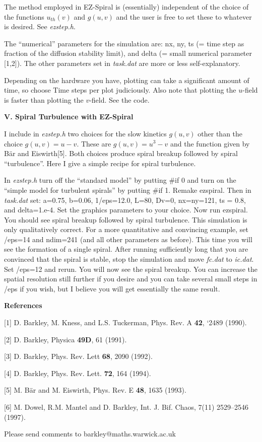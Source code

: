 \documentclass[12pt]{article}
\begin{document}
The method employed in EZ-Spiral is (essentially) independent of the
choice of the functions $u_{th}(v)$ and $g(u,v)$ and the user is free
to set these to whatever is desired.  See {\em ezstep.h}.

The ``numerical'' parameters for the simulation are: {\sf nx}, {\sf ny}, {\sf
ts} (= time step as fraction of the diffusion stability limit), and {\sf
delta} (= small numerical parameter [1,2]).  The other parameters set in {\em
task.dat} are more or less self-explanatory.

Depending on the hardware you have, plotting can take a significant amount of
time, so choose {\sf Time steps per plot} judiciously.  Also note that
plotting the $u$-field is faster than plotting the $v$-field. See the code.

{\bf V. Spiral Turbulence with EZ-Spiral} 

I include in {\em ezstep.h} two choices for the slow kinetics $g(u,v)$
other than the choice $g(u,v) = u-v$.  These are $g(u,v) = u^3-v$ and
the function given by B\"ar and Eiswirth[5].  Both choices produce
spiral breakup followed by spiral ``turbulence''.  Here I give a
simple recipe for spiral turbulence.

In {\em ezstep.h} turn off the ``standard model'' by putting {\sf \#if
0} and turn on the ``simple model for turbulent spirals'' by putting
{\sf \#if 1}.  Remake ezspiral.  Then in {\em task.dat} set: {\sf
a=0.75, b=0.06, 1/eps=12.0, L=80, Dv=0, nx=ny=121, ts = 0.8}, and {\sf
delta=1.e-4}.  Set the graphics parameters to your choice.  Now run
ezspiral.  You should see spiral breakup followed by spiral
turbulence. This simulation is only qualitatively correct.  For a more
quantitative and convincing example, set {/eps=14} and {\sf
ndim=241} (and all other parameters as before).  This time you will
see the formation of a single spiral.  After running sufficiently long
that you are convinced that the spiral is stable, stop the simulation
and move {\em fc.dat} to {\em ic.dat}.  Set {/eps=12} and
rerun.  You will now see the spiral breakup.  You can increase the
spatial resolution still further if you desire and you can take
several small steps in {/eps} if you wish, but I believe you will
get essentially the same result.


{\bf References} 

[1] D. Barkley, M. Kness, and L.S. Tuckerman, Phys. Rev. A {\bf 42}, 
`2489 (1990).

[2] D. Barkley, Physica {\bf 49D}, 61 (1991).

[3] D. Barkley, Phys. Rev. Lett {\bf 68}, 2090 (1992).

[4] D. Barkley, Phys. Rev. Lett. {\bf 72}, 164 (1994).

[5] M. B\"ar and  M. Eiswirth, Phys. Rev. E {\bf 48}, 1635 (1993).

[6] M. Dowel, R.M. Mantel and D. Barkley, Int. J. Bif. Chaos, 7(11) 2529--2546
(1997).

Please send comments to barkley@maths.warwick.ac.uk
\end{document}
